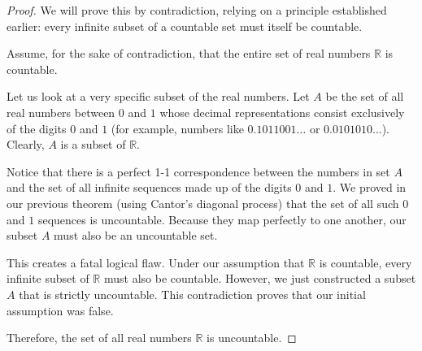 \documentclass{article}
\theoremstyle{mythm}
\begin{document}
\begin{proof}
We will prove this by contradiction, relying on a principle established earlier: every infinite subset of a countable set must itself be countable.

Assume, for the sake of contradiction, that the entire set of real numbers $\mathbb{R}$ is countable. 

Let us look at a very specific subset of the real numbers. Let $A$ be the set of all real numbers between $0$ and $1$ whose decimal representations consist exclusively of the digits $0$ and $1$ (for example, numbers like $0.1011001\dots$ or $0.0101010\dots$). Clearly, $A$ is a subset of $\mathbb{R}$.

Notice that there is a perfect 1-1 correspondence between the numbers in set $A$ and the set of all infinite sequences made up of the digits $0$ and $1$. We proved in our previous theorem (using Cantor's diagonal process) that the set of all such $0$ and $1$ sequences is uncountable. Because they map perfectly to one another, our subset $A$ must also be an uncountable set.

This creates a fatal logical flaw. Under our assumption that $\mathbb{R}$ is countable, every infinite subset of $\mathbb{R}$ must also be countable. However, we just constructed a subset $A$ that is strictly uncountable. This contradiction proves that our initial assumption was false. 

Therefore, the set of all real numbers $\mathbb{R}$ is uncountable.
\end{proof}
\end{document}
